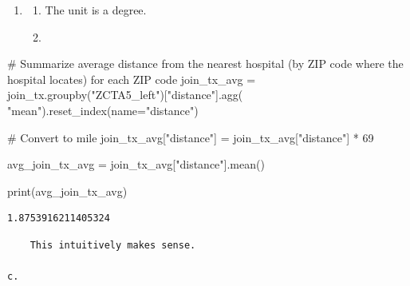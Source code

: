 \documentclass[
  letterpaper,
  DIV=11,
  numbers=noendperiod]{scrartcl}
\newenvironment{Shaded}{\begin{snugshade}}{\end{snugshade}}
\newcommand{\BuiltInTok}[1]{\textcolor[rgb]{0.00,0.23,0.31}{#1}}
\newcommand{\CommentTok}[1]{\textcolor[rgb]{0.37,0.37,0.37}{#1}}
\newcommand{\DecValTok}[1]{\textcolor[rgb]{0.68,0.00,0.00}{#1}}
\newcommand{\NormalTok}[1]{\textcolor[rgb]{0.00,0.23,0.31}{#1}}
\newcommand{\OperatorTok}[1]{\textcolor[rgb]{0.37,0.37,0.37}{#1}}
\newcommand{\StringTok}[1]{\textcolor[rgb]{0.13,0.47,0.30}{#1}}
\begin{document}
\begin{enumerate}
\def\labelenumi{\arabic{enumi}.}
\setcounter{enumi}{4}
\item
  \begin{enumerate}
  \def\labelenumii{\alph{enumii}.}
  \item
    The unit is a degree.
  \item
  \end{enumerate}
\end{enumerate}

\begin{Shaded}
\begin{Highlighting}[]
\CommentTok{\# Summarize average distance from the nearest hospital (by ZIP code where the hospital locates) for each ZIP code}
\NormalTok{join\_tx\_avg }\OperatorTok{=}\NormalTok{ join\_tx.groupby(}\StringTok{"ZCTA5\_left"}\NormalTok{)[}\StringTok{"distance"}\NormalTok{].agg(}
    \StringTok{"mean"}\NormalTok{).reset\_index(name}\OperatorTok{=}\StringTok{"distance"}\NormalTok{)}

\CommentTok{\# Convert to mile}
\NormalTok{join\_tx\_avg[}\StringTok{"distance"}\NormalTok{] }\OperatorTok{=}\NormalTok{ join\_tx\_avg[}\StringTok{"distance"}\NormalTok{] }\OperatorTok{*} \DecValTok{69}

\NormalTok{avg\_join\_tx\_avg }\OperatorTok{=}\NormalTok{ join\_tx\_avg[}\StringTok{"distance"}\NormalTok{].mean()}

\BuiltInTok{print}\NormalTok{(avg\_join\_tx\_avg)}
\end{Highlighting}
\end{Shaded}

\begin{verbatim}
1.8753916211405324
\end{verbatim}

\begin{verbatim}
    This intuitively makes sense.

c.
\end{verbatim}
\end{document}

